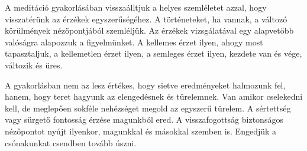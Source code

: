 
A meditáció gyakorlásában visszaálltjuk a helyes szemléletet azzal, hogy
visszatérünk az érzékek egyszerűségéhez. A történeteket, ha vannak, a
változó körülmények nézőpontjából szemléljük. Az érzékek vizsgálatával
egy alapvetőbb valóságra alapozzuk a figyelmünket. A kellemes érzet
ilyen, ahogy most tapasztaljuk, a kellemetlen érzet ilyen, a semleges
érzet ilyen, kezdete van és vége, változik és üres.

A gyakorlásban nem az lesz értékes, hogy sietve eredményeket halmozunk
fel, hanem, hogy teret hagyunk az elengedésnek és türelemnek. Van amikor
cselekedni kell, de meglepően sokféle nehézséget megold az egyszerű
türelem. A sértettség vagy sürgető fontosság érzése magunkból ered. A
visszafogottság biztonságos nézőpontot nyújt ilyenkor, magunkkal és
másokkal szemben is. Engedjük a csónakunkat csendben tovább úszni.
